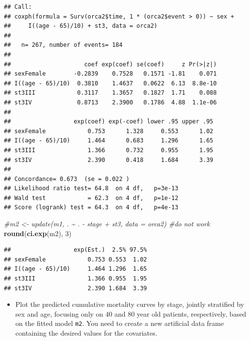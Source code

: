 \documentclass[
]{book}
\newenvironment{Shaded}{\begin{snugshade}}{\end{snugshade}}
\newcommand{\CommentTok}[1]{\textcolor[rgb]{0.56,0.35,0.01}{\textit{#1}}}
\newcommand{\DecValTok}[1]{\textcolor[rgb]{0.00,0.00,0.81}{#1}}
\newcommand{\FunctionTok}[1]{\textcolor[rgb]{0.13,0.29,0.53}{\textbf{#1}}}
\newcommand{\NormalTok}[1]{#1}
\providecommand{\tightlist}{%
  \setlength{\itemsep}{0pt}\setlength{\parskip}{0pt}}
\begin{document}
\begin{verbatim}
## Call:
## coxph(formula = Surv(orca2$time, 1 * (orca2$event > 0)) ~ sex + 
##     I((age - 65)/10) + st3, data = orca2)
## 
##   n= 267, number of events= 184 
## 
##                     coef exp(coef) se(coef)     z Pr(>|z|)
## sexFemale        -0.2839    0.7528   0.1571 -1.81    0.071
## I((age - 65)/10)  0.3810    1.4637   0.0622  6.13  8.8e-10
## st3III            0.3117    1.3657   0.1827  1.71    0.088
## st3IV             0.8713    2.3900   0.1786  4.88  1.1e-06
## 
##                  exp(coef) exp(-coef) lower .95 upper .95
## sexFemale            0.753      1.328     0.553      1.02
## I((age - 65)/10)     1.464      0.683     1.296      1.65
## st3III               1.366      0.732     0.955      1.95
## st3IV                2.390      0.418     1.684      3.39
## 
## Concordance= 0.673  (se = 0.022 )
## Likelihood ratio test= 64.8  on 4 df,   p=3e-13
## Wald test            = 62.3  on 4 df,   p=1e-12
## Score (logrank) test = 64.3  on 4 df,   p=4e-13
\end{verbatim}

\begin{Shaded}
\begin{Highlighting}[]
\CommentTok{\#m2 \textless{}{-} update(m1, . \textasciitilde{} . {-} stage + st3, data = orca2) \#do not work}
\FunctionTok{round}\NormalTok{(}\FunctionTok{ci.exp}\NormalTok{(m2), }\DecValTok{3}\NormalTok{)}
\end{Highlighting}
\end{Shaded}

\begin{verbatim}
##                  exp(Est.)  2.5% 97.5%
## sexFemale            0.753 0.553  1.02
## I((age - 65)/10)     1.464 1.296  1.65
## st3III               1.366 0.955  1.95
## st3IV                2.390 1.684  3.39
\end{verbatim}

\begin{itemize}
\tightlist
\item
  Plot the predicted cumulative mortality curves by stage,
  jointly stratified by sex and age, focusing
  only on 40 and 80 year old patients, respectively,
  based on the fitted model \texttt{m2}.
  You need to create a new artificial data frame
  containing the desired values for the covariates.
\end{itemize}
\end{document}
